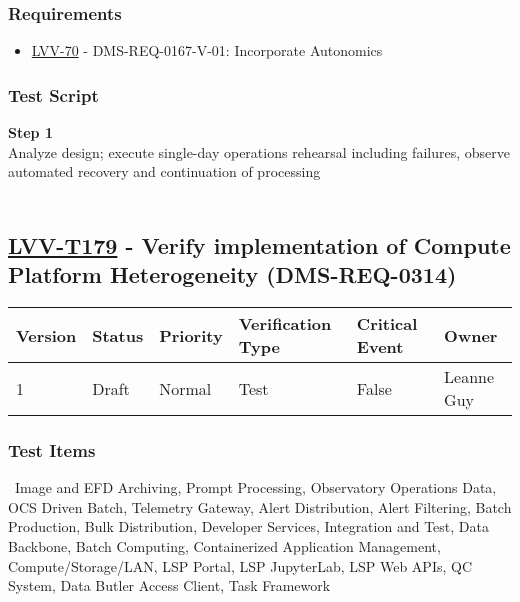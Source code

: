 \hypertarget{requirements-155}{%
\subsubsection{Requirements}\label{requirements-155}}

\begin{itemize}
\tightlist
\item
  \href{https://jira.lsstcorp.org/browse/LVV-70}{LVV-70} -
  DMS-REQ-0167-V-01: Incorporate Autonomics
\end{itemize}

\hypertarget{test-script-155}{%
\subsubsection{Test Script}\label{test-script-155}}

\textbf{Step 1}\\
Analyze design; execute single-day operations rehearsal including
failures, observe automated recovery and continuation of processing\\
~\\

\hypertarget{lvv-t179---verify-implementation-of-compute-platform-heterogeneity-dms-req-0314}{%
\subsection{\texorpdfstring{\href{https://jira.lsstcorp.org/secure/Tests.jspa\#/testCase/LVV-T179}{LVV-T179}
- Verify implementation of Compute Platform Heterogeneity
(DMS-REQ-0314)}{LVV-T179 - Verify implementation of Compute Platform Heterogeneity (DMS-REQ-0314)}}\label{lvv-t179---verify-implementation-of-compute-platform-heterogeneity-dms-req-0314}}

\begin{longtable}[]{@{}llllll@{}}
\toprule
Version & Status & Priority & Verification Type & Critical Event &
Owner\tabularnewline
\midrule
\endhead
1 & Draft & Normal & Test & False & Leanne Guy\tabularnewline
\bottomrule
\end{longtable}

\hypertarget{test-items-155}{%
\subsubsection{Test Items}\label{test-items-155}}

~Image and EFD Archiving, Prompt Processing, Observatory Operations
Data, OCS Driven Batch, Telemetry Gateway, Alert Distribution, Alert
Filtering, Batch Production, Bulk Distribution, Developer Services,
Integration and Test, Data Backbone, Batch Computing, Containerized
Application Management, Compute/Storage/LAN, LSP Portal, LSP JupyterLab,
LSP Web APIs, QC System, Data Butler Access Client, Task Framework

